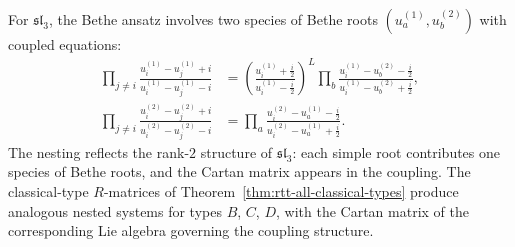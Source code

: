 \begin{remark}
\label{rem:nested-bethe}
For $\mathfrak{sl}_3$, the Bethe ansatz involves two species of
Bethe roots $(u_a^{(1)}, u_b^{(2)})$ with coupled equations:
\begin{align*}
\prod_{j \neq i} \frac{u_i^{(1)} - u_j^{(1)} + i}
{u_i^{(1)} - u_j^{(1)} - i}
&= \left(\frac{u_i^{(1)} + \frac{i}{2}}{u_i^{(1)} - \frac{i}{2}}\right)^{\!L}
\prod_{b} \frac{u_i^{(1)} - u_b^{(2)} - \frac{i}{2}}
{u_i^{(1)} - u_b^{(2)} + \frac{i}{2}}, \\
\prod_{j \neq i} \frac{u_i^{(2)} - u_j^{(2)} + i}
{u_i^{(2)} - u_j^{(2)} - i}
&= \prod_{a} \frac{u_i^{(2)} - u_a^{(1)} - \frac{i}{2}}
{u_i^{(2)} - u_a^{(1)} + \frac{i}{2}}.
\end{align*}
The nesting reflects the rank-$2$ structure of $\mathfrak{sl}_3$:
each simple root contributes one species of Bethe roots, and the
Cartan matrix appears in the coupling. The classical-type
$R$-matrices of Theorem~\ref{thm:rtt-all-classical-types} produce
analogous nested systems for types $B$, $C$, $D$, with the Cartan
matrix of the corresponding Lie algebra governing the coupling
structure.
\end{remark}

